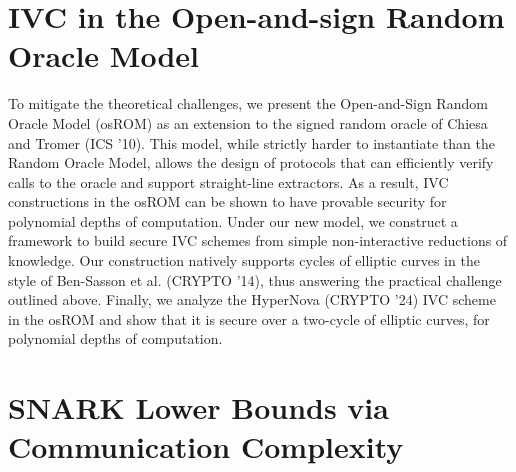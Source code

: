 \documentclass[11pt]{article}
\theoremstyle{definition}
\theoremstyle{remark}
\theoremstyle{plain}
\begin{document}
\section{\cite{cryptoeprint:2025/1663} IVC in the Open-and-sign Random Oracle Model}
To mitigate the theoretical challenges, we present the Open-and-Sign Random Oracle Model (osROM) as an extension to the signed random oracle of Chiesa and Tromer (ICS '10). This model, while strictly harder to instantiate than the Random Oracle Model, allows the design of protocols that can efficiently verify calls to the oracle and support straight-line extractors. As a result, IVC constructions in the osROM can be shown to have provable security for polynomial depths of computation. Under our new model, we construct a framework to build secure IVC schemes from simple non-interactive reductions of knowledge. Our construction natively supports cycles of elliptic curves in the style of Ben-Sasson et al. (CRYPTO '14), thus answering the practical challenge outlined above. Finally, we analyze the HyperNova (CRYPTO '24) IVC scheme in the osROM and show that it is secure over a two-cycle of elliptic curves, for polynomial depths of computation.

\section{\cite{cryptoeprint:2025/1698} SNARK Lower Bounds via Communication Complexity}
\end{document}
